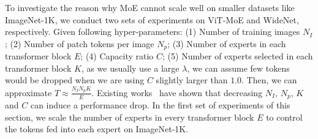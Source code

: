 \documentclass[letterpaper]{article} %
\begin{document}
To investigate the reason why MoE cannot scale well on smaller datasets like ImageNet-1K, we conduct two sets of experiments on ViT-MoE and WideNet, respectively. Given following hyper-parameters: (1) Number of training images $N_I$; (2) Number of patch tokens per image $N_p$; (3) Number of experts in each transformer block $E$; (4) Capacity ratio $C$; (5) Number of experts selected in each transformer block $K$, as we usually use a large $\lambda$, we can assume few tokens would be dropped when we are using $C$ slightly larger than $1.0$. Then, we can approximate $T \approx \frac{N_I N_p K}{E}$. Existing works~\citep{riquelme2021scaling,yang2021exploring} have shown that decreasing $N_I$, $N_p$, $K$ and $C$ can induce a performance drop. In the first set of experiments of this section, we scale the number of experts in every transformer block $E$ to control the tokens fed into each expert on ImageNet-1K.


\end{document}
